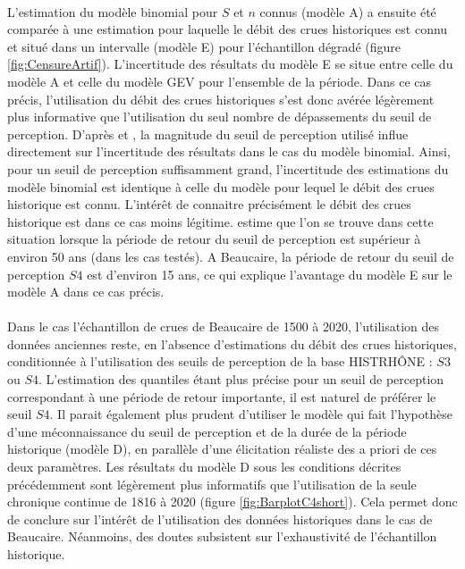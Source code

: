 \documentclass[11pt]{article}
\begin{document}
	\paragraph{} L'estimation du modèle binomial pour $S$ et $n$ connus (modèle A) a ensuite été comparée à une estimation pour laquelle le débit des crues historiques est connu et situé dans un intervalle (modèle E) pour l'échantillon dégradé (figure \ref{fig:CensureArtif}). L'incertitude des résultats du modèle E se situe entre celle du modèle A et celle du modèle GEV pour l'ensemble de la période. Dans ce cas précis, l'utilisation du débit des crues historiques s'est donc avérée légèrement plus informative que l'utilisation du seul nombre de dépassements du seuil de perception. D'après \cite{stedinger_flood_1986} et \citet{payrastre_usefulness_2011}, la magnitude du seuil de perception utilisé influe directement sur l'incertitude des résultats dans le cas du modèle binomial. Ainsi, pour un seuil de perception suffisamment grand, l'incertitude des estimations du modèle binomial est identique à celle du modèle pour lequel le débit des crues historique est connu. L'intérêt de connaitre précisément le débit des crues historique est dans ce cas moins légitime. \citet{payrastre_usefulness_2011} estime que l'on se trouve dans cette situation lorsque la période de retour du seuil de perception est supérieur à environ 50 ans (dans les cas testés). A Beaucaire, la période de retour du seuil de perception $S4$ est d'environ 15 ans, ce qui explique l'avantage du modèle E sur le modèle A dans ce cas précis.
	
		\paragraph{} Dans le cas l'échantillon de crues de Beaucaire de 1500 à 2020, l'utilisation des données anciennes reste, en l'absence d'estimations du débit des crues historiques, conditionnée à l'utilisation des seuils de perception de la base HISTRHÔNE : $S3$ ou $S4$. L'estimation des quantiles étant plus précise pour un seuil de perception correspondant à une période de retour importante, il est naturel de préférer le seuil $S4$. Il parait également plus prudent d'utiliser le modèle qui fait l'hypothèse d'une méconnaissance du seuil de perception et de la durée de la période historique (modèle D), en parallèle d'une élicitation réaliste des a priori de ces deux paramètres. Les résultats du modèle D sous les conditions décrites précédemment sont légèrement plus informatifs que l'utilisation de la seule chronique continue de 1816 à 2020 (figure \ref{fig:BarplotC4short}). Cela permet donc de conclure sur l'intérêt de l'utilisation des données historiques dans le cas de Beaucaire. Néanmoins, des doutes subsistent sur l'exhaustivité de l'échantillon historique. 
	
\end{document}
